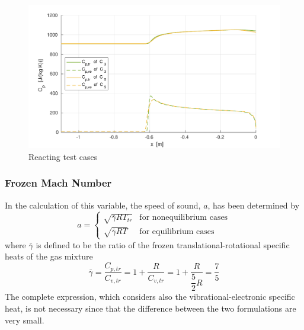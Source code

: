 \documentclass[10pt]{beamer}
\begin{document}
\begin{frame}
  \begin{figure}[ht]
    \centering
    \includegraphics[width=\textwidth]{stagnationLine/figures/specificHeatReac.pdf}
    \caption{Reacting test cases}
  \end{figure}
\end{frame}

\begin{frame}
  \frametitle{Frozen Mach Number} In the calculation of this variable, the
  speed of sound, $a$, has been determined by
  \begin{equation*}
    a=\begin{cases} \sqrt{\bar{\gamma}RT_{tr}}&\text{for nonequilibrium cases}
    \\ \sqrt{\bar{\gamma}RT}&\text{for equilibrium cases}
    \end{cases}
  \end{equation*}
  where $\bar{\gamma}$ is defined to be the ratio of the frozen
  trans\-la\-tio\-nal-ro\-ta\-tio\-nal specific heats of the gas mixture
  \begin{equation*}
    \bar{\gamma}=\frac{C_{p,tr}}{C_{v,tr}}=1+\frac{R}{C_{v,tr}}=
    1+\frac{R}{\dfrac{5}{2}R}=\frac{7}{5}
  \end{equation*}
  The complete expression, which considers also the
  vi\-bra\-tio\-nal-elec\-tro\-nic specific heat, is not necessary since that
  the difference between the two formulations are very small.
\end{frame}
\end{document}

